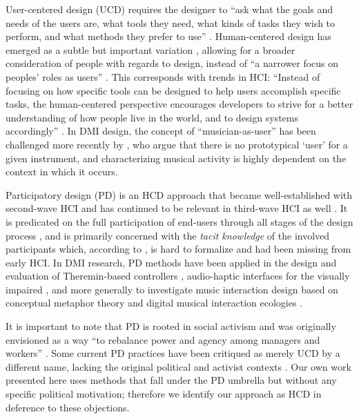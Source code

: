 \documentclass[letterpaper, 12pt]{article}
\begin{document}
User-centered design (UCD) requires the designer to ``ask what the goals and needs of the users are, what tools they need, what kinds of tasks they wish to perform, and what methods they prefer to use'' \citep[\citeauthor{Norman1988} \citeyear{Norman1988}, as cited in][p. 44]{El-shimy2014}. Human-centered design has emerged as a subtle but important variation \citep{Norman2013}, allowing for a broader consideration of people with regards to design, instead of ``a narrower focus on peoples' roles as users'' \citep[p. 45]{Steen2011}. This corresponds with trends in HCI: ``Instead of focusing on how specific tools can be designed to help users accomplish specific tasks, the human-centered perspective encourages developers to strive for a better understanding of how people live in the world, and to design systems accordingly'' \citep[p. 45]{El-shimy2014}. In DMI design, the concept of ``musician-as-user'' has been challenged more recently by \citet{Rodger2020}, who argue that there is no prototypical `user' for a given instrument, and characterizing musical activity is highly dependent on the context in which it occurs.

Participatory design (PD) is an HCD approach that became well-established with second-wave HCI \citep{Bodker2015} and has continued to be relevant in third-wave HCI as well \citep{Muller2012}. It is predicated on the full participation of end-users through all stages of the design process \citep{Steen2011}, and is primarily concerned with the \emph{tacit knowledge} of the involved participants which, according to \citet{Spinuzzi2005}, is hard to formalize and had been missing from early HCI. In DMI research, PD methods have been applied in the design and evaluation of Theremin-based controllers \citep{Geiger2008}, audio-haptic interfaces for the visually impaired \citep{Metatla2016}, and more generally to investigate music interaction design based on conceptual metaphor theory \citep{wilkie2013towards} and digital musical interaction ecologies \citep{Fyans:2012}.

It is important to note that PD is rooted in social activism and was originally envisioned as a way ``to rebalance power and agency among managers and workers'' \citep[p. 1]{Bannon2018}. Some current PD practices have been critiqued as merely UCD by a different name, lacking the original political and activist contexts \citep{Bannon2018}. Our own work presented here uses methods that fall under the PD umbrella but without any specific political motivation; therefore we identify our approach as HCD in deference to these objections.
\end{document}
